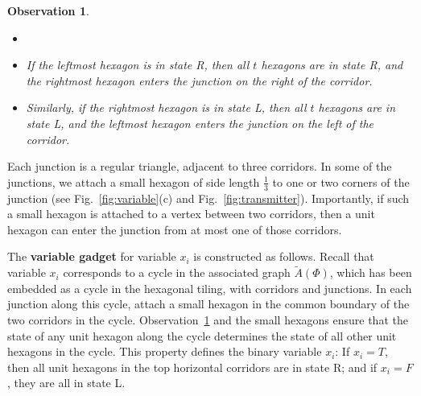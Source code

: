 \documentclass[runningheads]{article}
\newtheorem{observation}{Observation}
\begin{document}
\begin{observation}\label{obs:corridor}
\begin{itemize}%
\item[]
\item[(1)] If the leftmost hexagon is in state R, then all $t$ hexagons are in state R, and the rightmost hexagon enters the junction on the right of the corridor.
\item[(2)] Similarly, if the rightmost hexagon is in state L, then all $t$ hexagons are in state L, and the leftmost hexagon enters the junction on the left of the corridor.
\end{itemize}
\end{observation}

Each junction is a regular triangle, adjacent to three corridors. In some of the junctions, we attach a small hexagon of side length $\frac{1}{3}$ to one or two corners of the junction (see Fig.~\ref{fig:variable}(c) and Fig.~\ref{fig:transmitter}). Importantly, if such a small hexagon is attached to a vertex between two corridors, then a unit hexagon can enter the junction from at most one of those corridors.

The {\bf variable gadget} for variable $x_i$ is constructed as follows. Recall that variable $x_i$ corresponds to a cycle in the associated graph $\tilde{A}(\Phi)$, which has been embedded as a cycle in the hexagonal tiling, with corridors and junctions. In each junction along this cycle, attach a small hexagon in the common boundary of the two corridors in the cycle. Observation~\ref{obs:corridor} and the small hexagons ensure that the state of any unit hexagon along the cycle determines the state of all other unit hexagons in the cycle. This property defines the binary variable $x_i$: If $x_i=T$, then all unit hexagons in the top horizontal corridors are in state R; and if $x_i=F$, they are all in state L.
\end{document}
